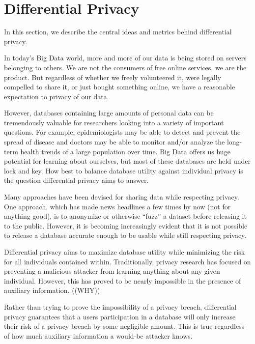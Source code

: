 \documentclass[12pt]{article}
\begin{document}
\section{Differential Privacy}\label{sec:differential_privacy}

In this section, we describe the central ideas and metrics behind differential privacy.


In today's Big Data world, more and more of our data is being stored on servers belonging to others.
We are not the consumers of free online services, we are the product.
But regardless of whether we freely volunteered it, were legally compelled to share it, or just bought something online, we have a reasonable expectation to privacy of our data.

However, databases containing large amounts of personal data can be tremendously valuable for researchers looking into a variety of important questions.
For example, epidemiologists may be able to detect and prevent the spread of disease and doctors may be able to monitor and/or analyze the long-term health trends of a large population over time.
Big Data offers us huge potential for learning about ourselves, but most of these databases are held under lock and key.
How best to balance database utility against individual privacy is the question differential privacy aims to answer.

Many approaches have been devised for sharing data while respecting privacy.
One approach, which has made news headlines a few times by now (not for anything good), is to anonymize or otherwise ``fuzz'' a dataset before releasing it to the public.
However, it is becoming increasingly evident that it is not possible to release a database accurate enough to be usable while still respecting privacy\cite{journals/cacm/Dwork11}.

Differential privacy aims to maximize database utility while minimizing the risk for all individuals contained within.
Traditionally, privacy research has focused on preventing a malicious attacker from learning anything about any given individual.
However, this has proved to be nearly impossible in the presence of auxiliary information. ((WHY))

Rather than trying to prove the impossibility of a privacy breach, differential privacy guarantees that a users participation in a database will only increase their risk of a privacy breach by some negligible amount.
This is true regardless of how much auxiliary information a would-be attacker knows.
\end{document}
